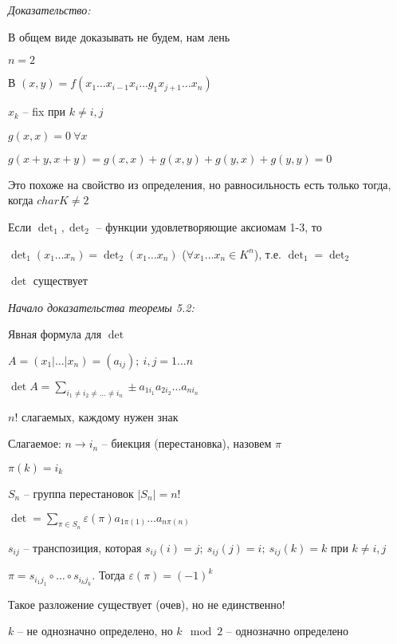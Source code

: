 \documentclass[12pt]{article}
\begin{document}
\textit{Доказательство:}

В общем виде доказывать не будем, нам лень

$n = 2$

В $(x, y) = f(x_1 \ldots x_{i - 1}x_i \ldots g_1 x_{j + 1} \ldots x_n)$

$x_k$ -- fix при $k \neq i, j$

$g(x, x)= 0\ \forall x$

$g(x + y, x + y) = g(x, x) + g(x, y) + g(y, x) + g(y, y) = 0$

\begin{Remark}{}
    Это похоже на свойство из определения, но равносильность есть только тогда, когда $charK \neq 2$
\end{Remark}

\begin{theo}{}
    Если $\det _1, \det _2$ -- функции удовлетворяющие аксиомам 1-3, то 
    
    $\det _1(x_1 \ldots x_n) = \det _2(x_1 \ldots x_n)$ ($\forall x_1 \ldots x_n \in K^n$), т.е. $\det _1 = \det _2$
\end{theo}

\begin{theo}{}
    $\det $ существует
\end{theo}

\textit{Начало доказательства теоремы 5.2:}

Явная формула для $\det $

$A = (x_1 | \ldots | x_n) = (a_{ij});\ i, j = 1 \ldots n$

$\det A = \sum\limits_{i_1 \neq i_2 \neq \ldots \neq i_n} \pm a_{1i_1} a_{2i_2} \ldots a_{ni_n}$

$n!$ слагаемых, каждому нужен знак

Слагаемое: $n \to i_n$ -- биекция (перестановка), назовем $\pi$

$\pi(k) = i_k$

$S_n$ -- группа перестановок $|S_n| = n!$

$\det  = \sum\limits_{\pi \in S_n} \varepsilon(\pi) a_{1\pi(1)} \ldots a_{n\pi(n)}$

$s_{ij}$ -- транспозиция, которая $s_{ij}(i) = j;\ s_{ij}(j) = i;\ s_{ij}(k) = k$ при $k \neq i, j$

$\pi = s_{i_1j_1} \circ \ldots \circ s_{i_kj_k}$. Тогда $\varepsilon(\pi) = (-1)^k$

Такое разложение существует (очев), но не единственно!

$k$ -- не однозначно определено, но $k \mod 2$ -- однозначно определено
\end{document}

